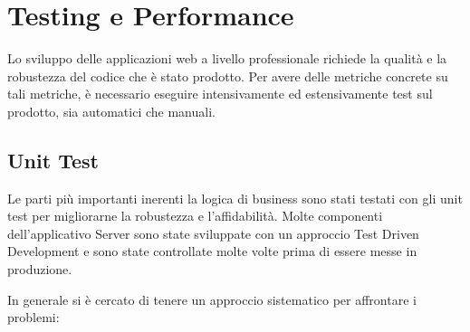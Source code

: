 

\chapter{Testing e Performance}

Lo sviluppo delle applicazioni web a livello professionale richiede la qualità e la robustezza del codice che è stato prodotto. Per avere delle metriche concrete su tali metriche, è necessario eseguire intensivamente ed estensivamente test sul prodotto, sia automatici che manuali.

\section{Unit Test}

Le parti più importanti inerenti la logica di business sono stati testati con gli unit test per migliorarne la robustezza e l'affidabilità. Molte componenti dell'applicativo Server sono state sviluppate con un approccio Test Driven Development e sono state controllate molte volte prima di essere messe in produzione.

\par In generale si è cercato di tenere un approccio sistematico per affrontare i problemi:


